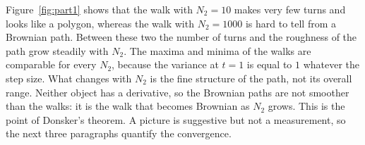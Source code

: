 Figure~\ref{fig:part1} shows that the walk with $N_2=10$ makes very few turns and looks like a polygon, whereas the walk with $N_2=1000$ is hard to tell from a Brownian path.
Between these two the number of turns and the roughness of the path grow steadily with $N_2$.
The maxima and minima of the walks are comparable for every $N_2$, because the variance at $t=1$ is equal to $1$ whatever the step size.
What changes with $N_2$ is the fine structure of the path, not its overall range.
Neither object has a derivative, so the Brownian paths are not smoother than the walks: it is the walk that becomes Brownian as $N_2$ grows.
This is the point of Donsker's theorem.
A picture is suggestive but not a measurement, so the next three paragraphs quantify the convergence.
